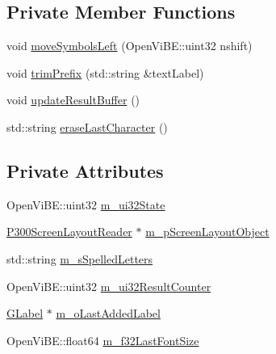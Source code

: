 \subsection*{Private Member Functions}
\begin{DoxyCompactItemize}
\item 
void \hyperlink{classOpenViBEApplications_1_1P300ResultAreaHandler_ae9575f59f9773db268087fbcc451529e}{moveSymbolsLeft} (OpenViBE::uint32 nshift)
\item 
void \hyperlink{classOpenViBEApplications_1_1P300ResultAreaHandler_a9a69e102171d38395ac6ff29587f05b6}{trimPrefix} (std::string \&textLabel)
\item 
void \hyperlink{classOpenViBEApplications_1_1P300ResultAreaHandler_a72a891bb78989a6136069bea2a837ca3}{updateResultBuffer} ()
\item 
std::string \hyperlink{classOpenViBEApplications_1_1P300ResultAreaHandler_af99ed5d8cedb354656869b1b32fb02be}{eraseLastCharacter} ()
\end{DoxyCompactItemize}
\subsection*{Private Attributes}
\begin{DoxyCompactItemize}
\item 
OpenViBE::uint32 \hyperlink{classOpenViBEApplications_1_1P300ResultAreaHandler_a0b7002021dda92347f5b6316602d0808}{m\_\-ui32State}
\item 
\hyperlink{classOpenViBEApplications_1_1P300ScreenLayoutReader}{P300ScreenLayoutReader} $\ast$ \hyperlink{classOpenViBEApplications_1_1P300ResultAreaHandler_aec434a5928970e2b273f267f9ee696a4}{m\_\-pScreenLayoutObject}
\item 
std::string \hyperlink{classOpenViBEApplications_1_1P300ResultAreaHandler_ae3147e0e80d2b5ab65887773af85c797}{m\_\-sSpelledLetters}
\item 
OpenViBE::uint32 \hyperlink{classOpenViBEApplications_1_1P300ResultAreaHandler_a25f33b2c3dddf96cdee177cfefd13885}{m\_\-ui32ResultCounter}
\item 
\hyperlink{classOpenViBEApplications_1_1GLabel}{GLabel} $\ast$ \hyperlink{classOpenViBEApplications_1_1P300ResultAreaHandler_a3091c5204bfd2fb48196af90f3e19401}{m\_\-oLastAddedLabel}
\item 
OpenViBE::float64 \hyperlink{classOpenViBEApplications_1_1P300ResultAreaHandler_a13b54227949939ec75dc9bfd263cee17}{m\_\-f32LastFontSize}
\end{DoxyCompactItemize}


